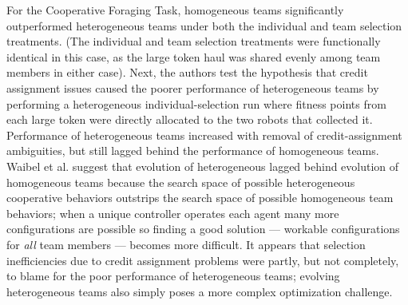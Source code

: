For the Cooperative Foraging Task, homogeneous teams significantly outperformed heterogeneous teams under both the individual and team selection treatments.
(The individual and team selection treatments were functionally identical in this case, as the large token haul was shared evenly among team members in either case).
Next, the authors test the hypothesis that credit assignment issues caused the poorer performance of heterogeneous teams by performing a heterogeneous individual-selection run where fitness points from each large token were directly allocated to the two robots that collected it.
Performance of heterogeneous teams increased with removal of credit-assignment ambiguities, but still lagged behind the performance of homogeneous teams.
Waibel et al. suggest that evolution of heterogeneous lagged behind evolution of homogeneous teams because the search space of possible heterogeneous cooperative behaviors outstrips the search space of possible homogeneous team behaviors; when a unique controller operates each agent many more configurations are possible so finding a good solution --- workable configurations for \textit{all} team members --- becomes more difficult.
It appears that selection inefficiencies due to credit assignment problems were partly, but not completely, to blame for the poor performance of heterogeneous teams; evolving heterogeneous teams also simply poses a more complex optimization challenge.

